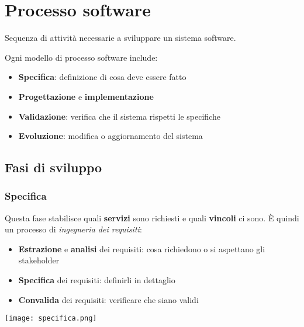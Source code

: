 \newpage
\section{Processo software}
\begin{definition}
	Sequenza di attività necessarie a sviluppare un sistema software.
\end{definition}
\noindent Ogni modello di processo software include:
\begin{itemize}
	\item \textbf{Specifica}: definizione di cosa deve essere fatto
	\item \textbf{Progettazione} e \textbf{implementazione}
	\item \textbf{Validazione}: verifica che il sistema rispetti le specifiche
	\item \textbf{Evoluzione}: modifica o aggiornamento del sistema
\end{itemize}

\subsection{Fasi di sviluppo}
\subsubsection{Specifica}
Questa fase stabilisce quali \textbf{servizi} sono richiesti e quali \textbf{vincoli} ci sono. È quindi un processo di \textit{ingegneria dei requisiti}:
\begin{itemize}
	\item \textbf{Estrazione} e \textbf{analisi} dei requisiti: cosa richiedono o si aspettano gli stakeholder
	\item \textbf{Specifica} dei requisiti: definirli in dettaglio
	\item \textbf{Convalida} dei requisiti: verificare che siano validi
\end{itemize}
\begin{center}
	\texttt{[image: specifica.png]}
\end{center}

